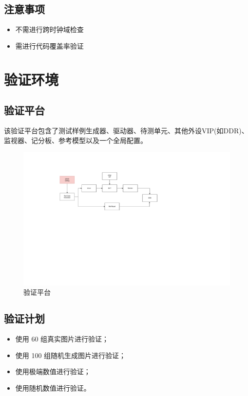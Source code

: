 \documentclass[12pt, a4paper, oneside]{ctexbook}
\begin{document}
		\section{注意事项}
		\begin{itemize}
			\item 不需进行跨时钟域检查
			\item 需进行代码覆盖率验证	
		\end{itemize}		
		
		
	\chapter{验证环境}
		\section{验证平台}
		该验证平台包含了测试样例生成器、驱动器、待测单元、其他外设VIP(如DDR)、监视器、记分板、参考模型以及一个全局配置。	
		\begin{figure}[h]
			\centering
			\includegraphics[scale=0.7]{pic/testbench}
			\caption{验证平台}
			\label{fig:testbench}
		\end{figure}

		\section{验证计划}
		\begin{itemize}
			\item 使用 60 组真实图片进行验证；
   			\item 使用 100 组随机生成图片进行验证；
      		\item 使用极端数值进行验证；
        	\item 使用随机数值进行验证。
		\end{itemize}
\end{document}
